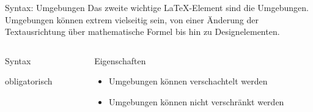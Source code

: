 \begin{frame}[fragile]{Syntax: Umgebungen}
  Das zweite wichtige \LaTeX-Element sind die Umgebungen.
  Umgebungen können extrem vielseitig sein, von einer Änderung der Textausrichtung über mathematische Formel bis hin zu Designelementen.
  \begin{columns}[T]
    \begin{column}{0.47\textwidth}
      \begin{block}{Syntax}
        \begin{lstverbatim}
        \begin{Umgebung*}[optional]
            {obligatorisch}
        \end{Umgebung*}
        \end{lstverbatim}
      \end{block}
    \end{column}
    \begin{column}{0.47\textwidth}
      \begin{block}{Eigenschaften}
        \begin{itemize}
          \item Umgebungen können verschachtelt werden
          \item Umgebungen können \alert{nicht} verschränkt werden
        \end{itemize}
      \end{block}
    \end{column}
  \end{columns}
\end{frame}

